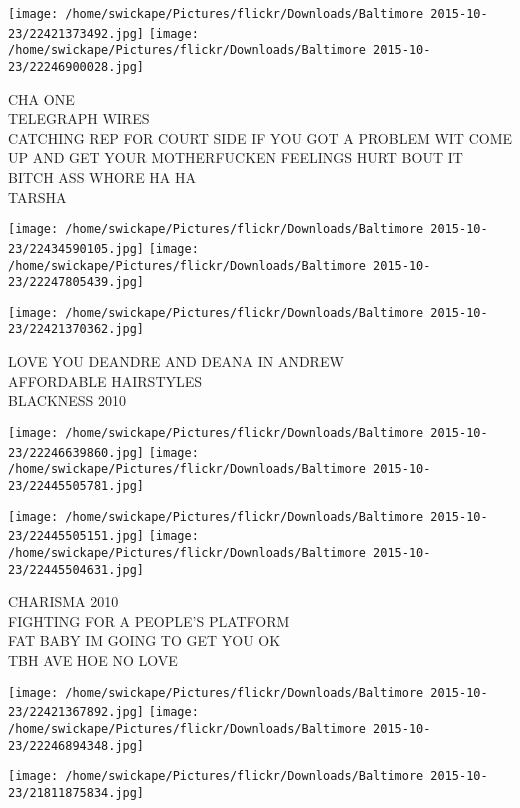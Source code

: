 \documentclass[10pt,letterpaper]{article}
\begin{document}
\texttt{[image: /home/swickape/Pictures/flickr/Downloads/Baltimore 2015-10-23/22421373492.jpg]}
\texttt{[image: /home/swickape/Pictures/flickr/Downloads/Baltimore 2015-10-23/22246900028.jpg]}

CHA ONE\\
TELEGRAPH WIRES\\
CATCHING REP FOR COURT SIDE IF YOU GOT A PROBLEM WIT COME UP AND GET YOUR MOTHERFUCKEN FEELINGS HURT BOUT IT BITCH ASS WHORE HA HA\\
TARSHA\\
\pagebreak

\texttt{[image: /home/swickape/Pictures/flickr/Downloads/Baltimore 2015-10-23/22434590105.jpg]}
\texttt{[image: /home/swickape/Pictures/flickr/Downloads/Baltimore 2015-10-23/22247805439.jpg]}

\vspace{0.25in}
\texttt{[image: /home/swickape/Pictures/flickr/Downloads/Baltimore 2015-10-23/22421370362.jpg]}

LOVE YOU DEANDRE AND DEANA IN ANDREW\\
AFFORDABLE HAIRSTYLES\\
BLACKNESS 2010\\
\pagebreak

\texttt{[image: /home/swickape/Pictures/flickr/Downloads/Baltimore 2015-10-23/22246639860.jpg]}
\texttt{[image: /home/swickape/Pictures/flickr/Downloads/Baltimore 2015-10-23/22445505781.jpg]}

\texttt{[image: /home/swickape/Pictures/flickr/Downloads/Baltimore 2015-10-23/22445505151.jpg]}
\texttt{[image: /home/swickape/Pictures/flickr/Downloads/Baltimore 2015-10-23/22445504631.jpg]}

CHARISMA 2010\\
FIGHTING FOR A PEOPLE'S PLATFORM\\
FAT BABY IM GOING TO GET YOU OK\\
TBH AVE HOE NO LOVE\\
\pagebreak

\texttt{[image: /home/swickape/Pictures/flickr/Downloads/Baltimore 2015-10-23/22421367892.jpg]}
\texttt{[image: /home/swickape/Pictures/flickr/Downloads/Baltimore 2015-10-23/22246894348.jpg]}

\vspace{0.25in}
\texttt{[image: /home/swickape/Pictures/flickr/Downloads/Baltimore 2015-10-23/21811875834.jpg]}
\end{document}
